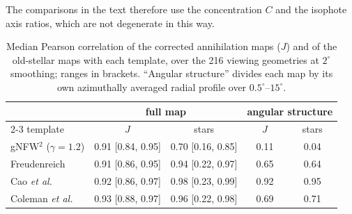 The comparisons in the text therefore use the concentration $C$ and the
isophote axis ratios, which are not degenerate in this way.

\begin{table}[b]
\caption{Median Pearson correlation of the corrected annihilation maps
($J$) and of the old-stellar maps with each template, over the 216
viewing geometries at $2^{\circ}$ smoothing; ranges in brackets.
``Angular structure'' divides each map by its own azimuthally
averaged radial profile over $0.5^{\circ}$--$15^{\circ}$.}
\label{tab:corr}
\begin{ruledtabular}
\begin{tabular}{lcccc}
 & \multicolumn{2}{c}{full map} & \multicolumn{2}{c}{angular structure} \\
\cline{2-3}\cline{4-5}
template & $J$ & stars & $J$ & stars \\ \hline
gNFW$^{2}$ ($\gamma=1.2$) & 0.91 [0.84, 0.95] & 0.70 [0.16, 0.85] & 0.11 & 0.04 \\
Freudenreich & 0.91 [0.86, 0.95] & 0.94 [0.22, 0.97] & 0.65 & 0.64 \\
Cao \textit{et al.} & 0.92 [0.86, 0.97] & 0.98 [0.23, 0.99] & 0.92 & 0.95 \\
Coleman \textit{et al.} & 0.93 [0.88, 0.97] & 0.96 [0.22, 0.98] & 0.69 & 0.71 \\
\end{tabular}
\end{ruledtabular}
\end{table}
